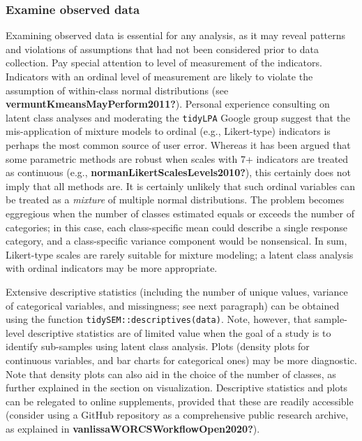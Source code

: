 \documentclass[
  ,man]{apa6}
\begin{document}
\hypertarget{examine-observed-data}{%
\subsubsection{Examine observed data}\label{examine-observed-data}}

Examining observed data is essential for any analysis,
as it may reveal patterns and violations of assumptions that had not been considered prior to data collection.
Pay special attention to level of measurement of the indicators.
Indicators with an ordinal level of measurement are likely to violate the assumption of within-class normal distributions (see \textbf{vermuntKmeansMayPerform2011?}).
Personal experience consulting on latent class analyses and moderating the \texttt{tidyLPA} Google group
suggest that the mis-application of mixture models to ordinal (e.g., Likert-type) indicators is perhaps the most common source of user error.
Whereas it has been argued that some parametric methods are robust when scales with 7+ indicators are treated as continuous (e.g., \textbf{normanLikertScalesLevels2010?}),
this certainly does not imply that all methods are.
It is certainly unlikely that such ordinal variables can be treated as a \emph{mixture} of multiple normal distributions.
The problem becomes eggregious when the number of classes estimated equals or exceeds the number of categories; in this case, each class-specific mean could describe a single response category, and a class-specific variance component would be nonsensical.
In sum, Likert-type scales are rarely suitable for mixture modeling;
a latent class analysis with ordinal indicators may be more appropriate.

Extensive descriptive statistics (including the number of unique values, variance of categorical variables, and missingness; see next paragraph) can be obtained using the function \texttt{tidySEM::descriptives(data)}.
Note, however, that sample-level descriptive statistics are of limited value when the goal of a study is to identify sub-samples using latent class analysis.
Plots (density plots for continuous variables, and bar charts for categorical ones) may be more diagnostic.
Note that density plots can also aid in the choice of the number of classes, as further explained in the section on visualization.
Descriptive statistics and plots can be relegated to online supplements, provided that these are readily accessible (consider using a GitHub repository as a comprehensive public research archive, as explained in \textbf{vanlissaWORCSWorkflowOpen2020?}).
\end{document}
